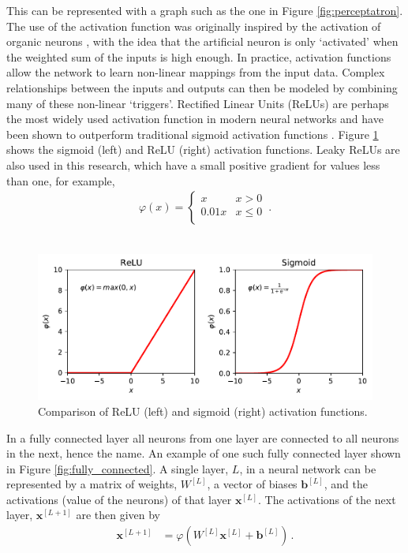 \documentclass[11pt,a4paper,onecolumn]{report}
\begin{document}
This can be represented with a graph such as the one in Figure
\ref{fig:perceptatron}. The use of the activation function was originally
inspired by the activation of organic neurons \citep{hodgkin1952}, with the idea
that the artificial neuron is only `activated' when the weighted sum of the
inputs is high enough. In practice, activation functions allow the network to
learn non-linear mappings from the input data. Complex relationships between the
inputs and outputs can then be modeled by combining many of these non-linear
`triggers'. Rectified Linear Units (ReLUs) are perhaps the most widely used
activation function in modern neural networks and have been shown to outperform
traditional sigmoid activation functions \citep{glorot2011}. Figure
\ref{fig:activation} shows the sigmoid (left) and ReLU (right) activation
functions. Leaky ReLUs are also used in this research, which have a small
positive gradient for values less than one, for example,
\begin{align}
  \varphi (x) = \begin{cases} 
    x & x > 0 \\
    0.01x & x \leq 0 \\
 \end{cases} \, .
\end{align}
\\


\begin{figure}[t]
  \centering
  \includegraphics[width=\linewidth]{sigmoid_v_relu.pdf}
  \caption{Comparison of ReLU (left) and sigmoid (right) activation functions.}
  \label{fig:activation}
\end{figure}

In a fully connected layer all neurons from one layer are connected to all
neurons in the next, hence the name. An example of one such fully connected
layer shown in Figure \ref{fig:fully_connected}. A single layer, \(L\), in a
neural network can be represented by a matrix of weights, \(W^{[L]}\), a
vector of biases \(\bm{b}^{[L]}\), and the activations (value of the neurons) of
that layer \(\bm{x}^{[L]}\). The activations of the next layer,
\(\bm{x}^{[L+1]}\) are then given by
\begin{align}
  \label{eqn:matrix_repr}
  \bm{x}^{[L+1]} &= \varphi \left(W^{[L]}\bm{x}^{[L]} +\bm{b}^{[L]}\right)\,.
\end{align}
\\
\end{document}
